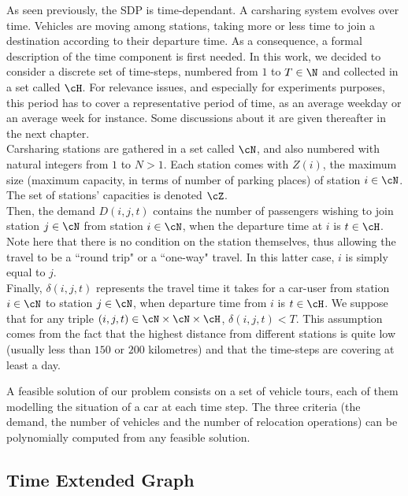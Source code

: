 \begin{bibunit}[ieeetr]
As seen previously, the SDP is time-dependant.
A carsharing system evolves over time.
Vehicles are moving among stations, taking more or less time to join a destination according to their departure time.
As a consequence, a formal description of the time component is first needed.
In this work, we decided to consider a discrete set of time-steps, numbered from $1$ to $T \in \N$ and collected in a set called ${\cH}$.
For relevance issues, and especially for experiments purposes, this period has to cover a representative period of time, as an average weekday or an average week for instance.
Some discussions about it are given thereafter in the next chapter.
~\\

Carsharing stations are gathered in a set called ${\cN}$, and also numbered with natural integers from $1$ to $N > 1$.
Each station comes with $Z(i)$, the maximum size (\ie maximum capacity, in terms of number of parking places) of station $i \in {\cN}$.
The set of stations' capacities is denoted $\cZ$.
~\\

Then, the demand $D(i,j,t)$ contains the number of passengers wishing to join station $j \in \cN$ from station $i \in \cN$, when the departure time at $i$ is $t \in \cH$.
Note here that there is no condition on the station themselves, thus allowing the travel to be a ``round trip" or a ``one-way" travel.
In this latter case, $i$ is simply equal to $j$.
~\\

Finally, $\delta(i,j,t)$ represents the travel time it takes for a car-user from station $i \in \cN$ to station $j \in \cN$, when departure time from $i$ is $t \in \cH$.
We suppose that for any triple $(i,j,t)\in \cN \times \cN \times \cH$, $\delta(i,j,t)<T$.
This assumption comes from the fact that the highest distance from different stations is quite low (usually less than $150$ or $200$ kilometres) and that the time-steps are covering at least a day.

A feasible solution of our problem consists on a set of vehicle tours, each of them modelling the situation of a car at each time step.
The three criteria (the demand, the number of vehicles and the number of relocation operations) can be polynomially computed from any feasible solution.

\subsection{Time Extended Graph}


\end{bibunit}
